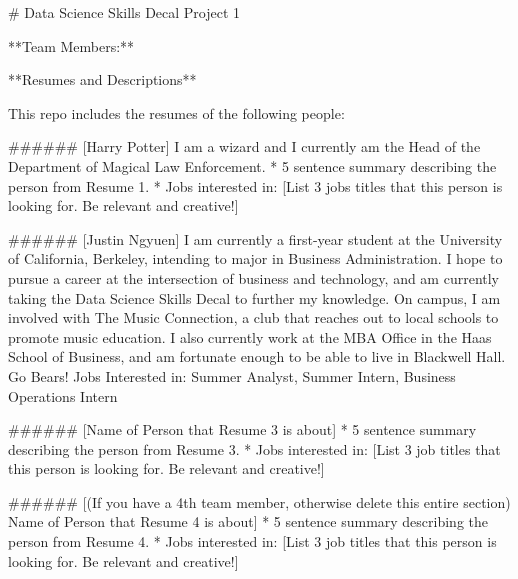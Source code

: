 # Data Science Skills Decal Project 1

**Team Members:**

**Resumes and Descriptions**

This repo includes the resumes of the following people:


###### [Harry Potter]
I am a wizard and I currently am the Head of the Department of Magical Law Enforcement.
* 5 sentence summary describing the person from Resume 1.
* Jobs interested in: [List 3 jobs titles that this person is looking for. Be relevant and creative!]

###### [Justin Ngyuen]
I am currently a first-year student at the University of California, Berkeley, intending to major in Business Administration. I hope to pursue a career at the intersection of business and technology, and am currently taking the Data Science Skills Decal to further my knowledge. On campus, I am involved with The Music Connection, a club that reaches out to local schools to promote music education. I also currently work at the MBA Office in the Haas School of Business, and am fortunate enough to be able to live in Blackwell Hall. Go Bears! Jobs Interested in: Summer Analyst, Summer Intern, Business Operations Intern

###### [Name of Person that Resume 3 is about]
* 5 sentence summary describing the person from Resume 3.
* Jobs interested in: [List 3 job titles that this person is looking for. Be relevant and creative!]

###### [(If you have a 4th team member, otherwise delete this entire section) Name of Person that Resume 4 is about]
* 5 sentence summary describing the person from Resume 4.
* Jobs interested in: [List 3 job titles that this person is looking for. Be relevant and creative!]
